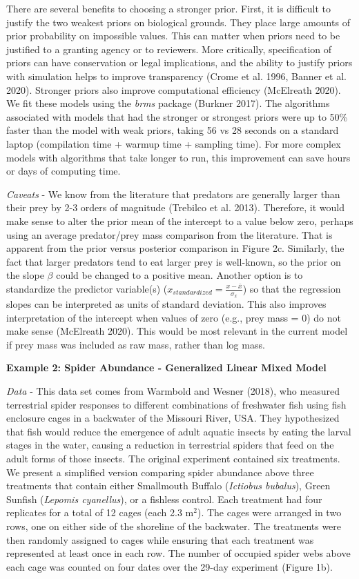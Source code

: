 \documentclass[
  12pt,
]{article}
\begin{document}
There are several benefits to choosing a stronger prior. First, it is
difficult to justify the two weakest priors on biological grounds. They
place large amounts of prior probability on impossible values. This can
matter when priors need to be justified to a granting agency or to
reviewers. More critically, specification of priors can have
conservation or legal implications, and the ability to justify priors
with simulation helps to improve transparency (Crome et al. 1996, Banner
et al. 2020). Stronger priors also improve computational efficiency
(McElreath 2020). We fit these models using the \emph{brms} package
(Burkner 2017). The algorithms associated with models that had the
stronger or strongest priors were up to 50\% faster than the model with
weak priors, taking 56 vs 28 seconds on a standard laptop (compilation
time + warmup time + sampling time). For more complex models with
algorithms that take longer to run, this improvement can save hours or
days of computing time.

\emph{Caveats} - We know from the literature that predators are
generally larger than their prey by 2-3 orders of magnitude (Trebilco et
al. 2013). Therefore, it would make sense to alter the prior mean of the
intercept to a value below zero, perhaps using an average predator/prey
mass comparison from the literature. That is apparent from the prior
versus posterior comparison in Figure 2c. Similarly, the fact that
larger predators tend to eat larger prey is well-known, so the prior on
the slope \(\beta\) could be changed to a positive mean. Another option
is to standardize the predictor variable(s)
(\(x_{standardized} = \frac{x-\bar{x}}{\sigma_{x}}\)) so that the
regression slopes can be interpreted as units of standard deviation.
This also improves interpretation of the intercept when values of zero
(e.g., prey mass = 0) do not make sense (McElreath 2020). This would be
most relevant in the current model if prey mass was included as raw
mass, rather than log mass.

\textbf{Example 2: Spider Abundance - Generalized Linear Mixed Model}

\emph{Data} - This data set comes from Warmbold and Wesner (2018), who
measured terrestrial spider responses to different combinations of
freshwater fish using fish enclosure cages in a backwater of the
Missouri River, USA. They hypothesized that fish would reduce the
emergence of adult aquatic insects by eating the larval stages in the
water, causing a reduction in terrestrial spiders that feed on the adult
forms of those insects. The original experiment contained six
treatments. We present a simplified version comparing spider abundance
above three treatments that contain either Smallmouth Buffalo
(\emph{Ictiobus bubalus}), Green Sunfish (\emph{Lepomis cyanellus}), or
a fishless control. Each treatment had four replicates for a total of 12
cages (each 2.3 m\(^2\)). The cages were arranged in two rows, one on
either side of the shoreline of the backwater. The treatments were then
randomly assigned to cages while ensuring that each treatment was
represented at least once in each row. The number of occupied spider
webs above each cage was counted on four dates over the 29-day
experiment (Figure 1b).
\end{document}
